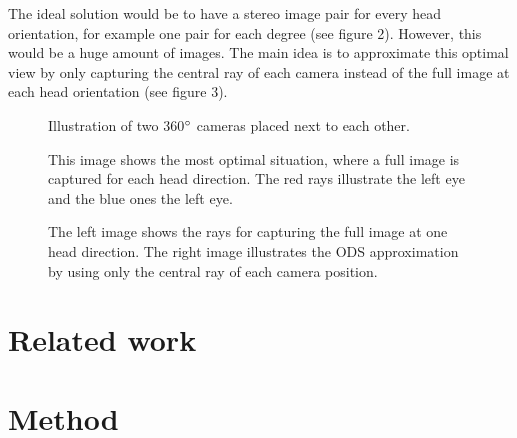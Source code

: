 \documentclass[10pt,twocolumn,letterpaper]{article}
\begin{document}
The ideal solution would be to have a stereo image pair for every head orientation, for example one pair for each degree (see figure 2). However, this would be a huge amount of images. The main idea is to approximate this optimal view by only capturing the central ray of each camera instead of the full image at each head orientation (see figure 3).

\begin{figure}[t]
\begin{center}
\fbox{\rule{0pt}{2in} \rule{0.9\linewidth}{0pt}}
\end{center}
   \caption{Illustration of two 360$\degree$ cameras placed next to each other.}
\label{fig:long}
\label{fig:onecol}
\end{figure}

\begin{figure}[t]
\begin{center}
\fbox{\rule{0pt}{2in} \rule{0.9\linewidth}{0pt}}
\end{center}
   \caption{This image shows the most optimal situation, where a full image is captured for each head direction. The red rays illustrate the left eye and the blue ones the left eye.}
\label{fig:long}
\label{fig:onecol}
\end{figure}

\begin{figure}[t]
\begin{center}
\fbox{\rule{0pt}{2in} \rule{0.9\linewidth}{0pt}}
\end{center}
   \caption{The left image shows the rays for capturing the full image at one head direction. The right image illustrates the ODS approximation by using only the central ray of each camera position.}
\label{fig:long}
\label{fig:onecol}
\end{figure}


\section{Related work}


\section{Method}
\end{document}
